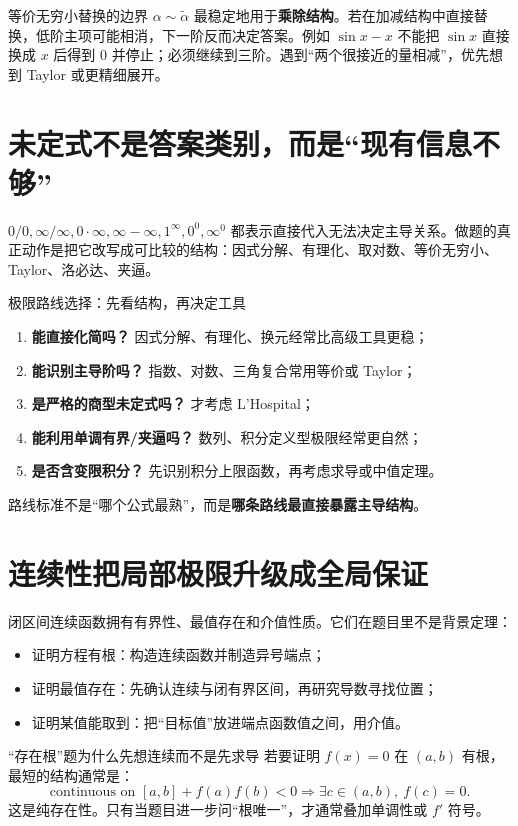 \documentclass[11pt,a4paper,openany]{ctexbook}
\newcommand{\key}[1]{\textbf{\color{deep}#1}}
\begin{document}
\begin{warnbox}{等价无穷小替换的边界}
$\alpha\sim\tilde\alpha$ 最稳定地用于\key{乘除结构}。若在加减结构中直接替换，低阶主项可能相消，下一阶反而决定答案。例如 $\sin x-x$ 不能把 $\sin x$ 直接换成 $x$ 后得到 0 并停止；必须继续到三阶。遇到“两个很接近的量相减”，优先想到 Taylor 或更精细展开。
\end{warnbox}

\section{未定式不是答案类别，而是“现有信息不够”}
$0/0,\infty/\infty,0\cdot\infty,\infty-\infty,1^\infty,0^0,\infty^0$ 都表示直接代入无法决定主导关系。做题的真正动作是把它改写成可比较的结构：因式分解、有理化、取对数、等价无穷小、Taylor、洛必达、夹逼。

\begin{methodbox}{极限路线选择：先看结构，再决定工具}
\begin{enumerate}
  \item \key{能直接化简吗？} 因式分解、有理化、换元经常比高级工具更稳；
  \item \key{能识别主导阶吗？} 指数、对数、三角复合常用等价或 Taylor；
  \item \key{是严格的商型未定式吗？} 才考虑 L'Hospital；
  \item \key{能利用单调有界/夹逼吗？} 数列、积分定义型极限经常更自然；
  \item \key{是否含变限积分？} 先识别积分上限函数，再考虑求导或中值定理。
\end{enumerate}
路线标准不是“哪个公式最熟”，而是\key{哪条路线最直接暴露主导结构}。
\end{methodbox}

\section{连续性把局部极限升级成全局保证}
闭区间连续函数拥有有界性、最值存在和介值性质。它们在题目里不是背景定理：
\begin{itemize}
  \item 证明方程有根：构造连续函数并制造异号端点；
  \item 证明最值存在：先确认连续与闭有界区间，再研究导数寻找位置；
  \item 证明某值能取到：把“目标值”放进端点函数值之间，用介值。
\end{itemize}

\begin{examplebox}{“存在根”题为什么先想连续而不是先求导}
若要证明 $f(x)=0$ 在 $(a,b)$ 有根，最短的结构通常是：
\[
\text{continuous on }[a,b]+f(a)f(b)<0\Longrightarrow \exists c\in(a,b),\ f(c)=0.
\]
这是纯存在性。只有当题目进一步问“根唯一”，才通常叠加单调性或 $f'$ 符号。
\end{examplebox}
\end{document}
